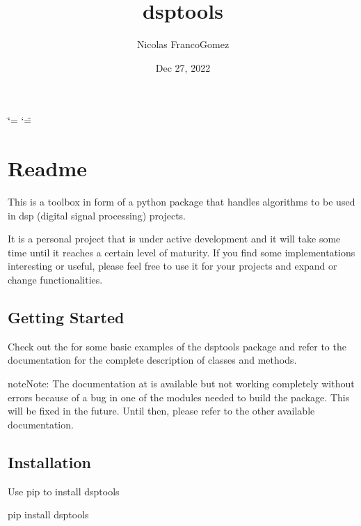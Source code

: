 \documentclass[letterpaper,10pt,english]{sphinxmanual}
\title{dsptools}
\date{Dec 27, 2022}
\author{Nicolas Franco\sphinxhyphen{}Gomez}
\begin{document}
\ifdefined\shorthandoff
  \ifnum\catcode`\=\string=\active\shorthandoff{=}\fi
  \ifnum\catcode`\"=\active{}\fi
\fi

\pagestyle{empty}
\sphinxmaketitle
\pagestyle{plain}
\sphinxtableofcontents
\pagestyle{normal}
\label{\detokenize{index::doc}}


\sphinxstepscope


\chapter{Readme}
\label{\detokenize{readme:readme}}\label{\detokenize{readme::doc}}
\sphinxAtStartPar
This is a toolbox in form of a python package that handles algorithms to be used in dsp (digital signal processing) projects.

\sphinxAtStartPar
It is a personal project that is under active development and it will take some time until it reaches a certain level of maturity.
If you find some implementations interesting or useful, please feel free to use it for your projects and expand or change
functionalities.


\section{Getting Started}
\label{\detokenize{readme:getting-started}}
\sphinxAtStartPar
Check out the  for some basic examples of the dsptools package
and refer to the documentation for the complete description of classes and methods.

\begin{sphinxadmonition}{note}{Note:}
\sphinxAtStartPar
The documentation at  is available but not working completely without errors
because of a bug in one of the modules needed to build the package. This will be fixed in the future.
Until then, please refer to the other available documentation.
\end{sphinxadmonition}


\section{Installation}
\label{\detokenize{readme:installation}}
\sphinxAtStartPar
Use pip to install dsptools

\begin{sphinxVerbatim}[commandchars=\\\{\}]
pip install dsptools
\end{sphinxVerbatim}
\end{document}

